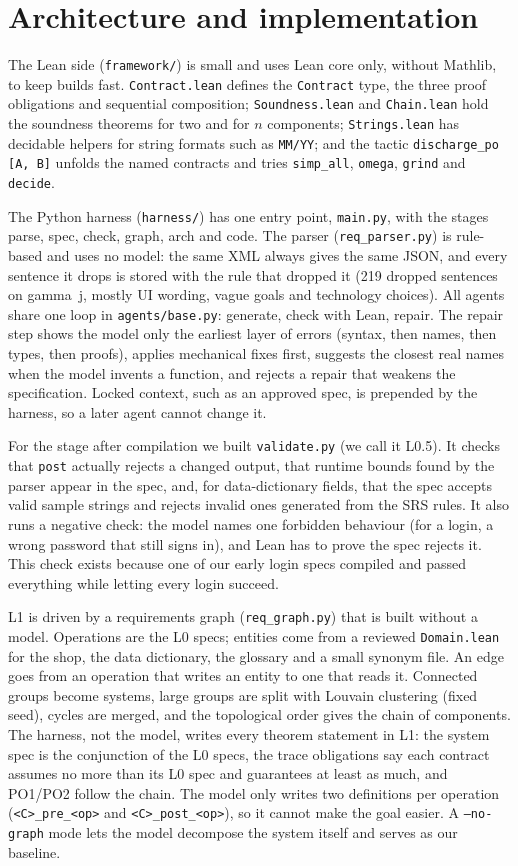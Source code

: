 \documentclass[10pt,a4paper]{article}
\newcommand{\code}[1]{\texttt{\small #1}}
\begin{document}
\section{Architecture and implementation}
The Lean side (\code{framework/}) is small and uses Lean core only, without Mathlib, to keep builds fast. \code{Contract.lean} defines the \code{Contract} type, the three proof obligations and sequential composition; \code{Soundness.lean} and \code{Chain.lean} hold the soundness theorems for two and for $n$ components; \code{Strings.lean} has decidable helpers for string formats such as \code{MM/YY}; and the tactic \code{discharge\_po [A, B]} unfolds the named contracts and tries \code{simp\_all}, \code{omega}, \code{grind} and \code{decide}.

The Python harness (\code{harness/}) has one entry point, \code{main.py}, with the stages parse, spec, check, graph, arch and code. The parser (\code{req\_parser.py}) is rule-based and uses no model: the same XML always gives the same JSON, and every sentence it drops is stored with the rule that dropped it (219 dropped sentences on gamma~j, mostly UI wording, vague goals and technology choices). All agents share one loop in \code{agents/base.py}: generate, check with Lean, repair. The repair step shows the model only the earliest layer of errors (syntax, then names, then types, then proofs), applies mechanical fixes first, suggests the closest real names when the model invents a function, and rejects a repair that weakens the specification. Locked context, such as an approved spec, is prepended by the harness, so a later agent cannot change it.

For the stage after compilation we built \code{validate.py} (we call it L0.5). It checks that \code{post} actually rejects a changed output, that runtime bounds found by the parser appear in the spec, and, for data-dictionary fields, that the spec accepts valid sample strings and rejects invalid ones generated from the SRS rules. It also runs a negative check: the model names one forbidden behaviour (for a login, a wrong password that still signs in), and Lean has to prove the spec rejects it. This check exists because one of our early login specs compiled and passed everything while letting every login succeed.

L1 is driven by a requirements graph (\code{req\_graph.py}) that is built without a model. Operations are the L0 specs; entities come from a reviewed \code{Domain.lean} for the shop, the data dictionary, the glossary and a small synonym file. An edge goes from an operation that writes an entity to one that reads it. Connected groups become systems, large groups are split with Louvain clustering (fixed seed), cycles are merged, and the topological order gives the chain of components. The harness, not the model, writes every theorem statement in L1: the system spec is the conjunction of the L0 specs, the trace obligations say each contract assumes no more than its L0 spec and guarantees at least as much, and PO1/PO2 follow the chain. The model only writes two definitions per operation (\code{<C>\_pre\_<op>} and \code{<C>\_post\_<op>}), so it cannot make the goal easier. A \code{--no-graph} mode lets the model decompose the system itself and serves as our baseline.
\end{document}
